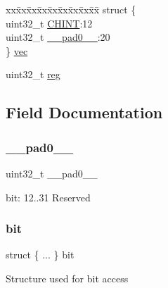 \begin{DoxyCompactItemize}
\begin{tabbing}
\end{tabbing}\item 
\begin{tabbing}
xx\=xx\=xx\=xx\=xx\=xx\=xx\=xx\=xx\=\kill
struct \{\\
\>uint32\_t \mbox{\hyperlink{union_d_m_a_c___i_n_t_s_t_a_t_u_s___type_a5ef8383c5958902bca7242ba4ccd96d8}{CHINT}}:12\\
\>uint32\_t \mbox{\hyperlink{union_d_m_a_c___i_n_t_s_t_a_t_u_s___type_a3e57c2ef1c3ffb36722f000cc1156824}{\_\_pad0\_\_}}:20\\
\} \mbox{\hyperlink{union_d_m_a_c___i_n_t_s_t_a_t_u_s___type_a6db11e42f6f46d5b8f61cd9eb3520430}{vec}}\\

\end{tabbing}\item 
uint32\+\_\+t \mbox{\hyperlink{union_d_m_a_c___i_n_t_s_t_a_t_u_s___type_a6b91636401516a477989a336376d7b40}{reg}}
\end{DoxyCompactItemize}


\subsection{Field Documentation}
\mbox{\label{union_d_m_a_c___i_n_t_s_t_a_t_u_s___type_a3e57c2ef1c3ffb36722f000cc1156824}} 
\subsubsection{\texorpdfstring{\_\_pad0\_\_}{\_\_pad0\_\_}}
{\footnotesize\ttfamily uint32\+\_\+t \+\_\+\+\_\+pad0\+\_\+\+\_\+}

bit\+: 12..31 Reserved \mbox{\label{union_d_m_a_c___i_n_t_s_t_a_t_u_s___type_ad2e05d8b223d59265369864b24cd0319}} 
\subsubsection{\texorpdfstring{bit}{bit}}
{\footnotesize\ttfamily struct \{ ... \}   bit}

Structure used for bit access \mbox{\label{union_d_m_a_c___i_n_t_s_t_a_t_u_s___type_a5ef8383c5958902bca7242ba4ccd96d8}} 
